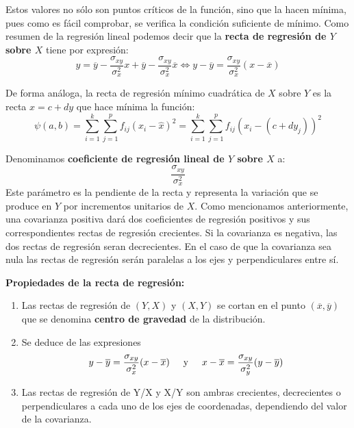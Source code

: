 \documentclass[10pt, a4paper]{article}
\makeatletter
\renewenvironment{proof}[1][\proofname] {\par\pushQED{\qed}\normalfont\topsep6\p@\@plus6\p@\relax\trivlist\item[\hskip\labelsep\itshape\sffamily#1\@addpunct{.}]\ignorespaces}{\popQED\endtrivlist\@endpefalse}
\theoremstyle{theorem-style}
\theoremstyle{definition-style}
\theoremstyle{remark-style}
\theoremstyle{example-style}
\theoremstyle{definition-style}
\theoremstyle{remark-style}
\makeatother
\begin{document}
\pagebreak

Estos valores no sólo son puntos críticos de la función, sino que la hacen
	 mínima, pues como es fácil comprobar, se verifica la condición suficiente de
	 mínimo. Como resumen de la regresión lineal podemos decir que la \textbf{recta de
	 regresión de $Y$ sobre $X$} tiene por expresión:
	$$ y = \overline{y} - \frac{\sigma_{xy}}{\sigma_x^2} x + \overline{y} -
	\frac{\sigma_{xy}}{\sigma_x^2} \overline{x} \iff y - \overline{y} = \frac{\sigma_{xy}}{\sigma_x^2} (x - \overline{x}) $$

	De forma análoga, la recta de regresión mínimo cuadrática de $X$ sobre $Y$ es la
	recta $x = c +dy$ que hace mínima la función: $$\psi (a,b) = \sum_{i=1}^k
	\sum_{j=1}^p f_{ij} {(x_i - \hat{x})}^2 = \sum_{i=1}^k
	\sum_{j=1}^p f_{ij} {(x_i - (c +dy_j))}^2 $$
	
\vspace{2mm}

Denominamos \textbf{coeficiente de regresión lineal de $Y$ sobre $X$} a: $$\frac{\sigma_{xy}}{\sigma_x^2}$$
	Este parámetro es la
	pendiente de la recta y representa la variación que se produce en $Y$ por
	incrementos unitarios de $X$. Como mencionamos anteriormente, una covarianza positiva
	dará dos coeficientes de regresión
	positivos y sus correspondientes rectas de regresión crecientes. Si la
	covarianza es negativa, las dos rectas de regresión seran decrecientes. En el
	caso de que la covarianza sea nula las rectas de regresión serán paralelas a
	los ejes y perpendiculares entre sí.
	
\vspace{5mm}
\textbf{Propiedades de la recta de regresión:}
\begin{enumerate}
	\item Las rectas de regresión de $(Y,X)$ y $(X,Y)$  se cortan en el punto
$(\overline{x},\overline{y} ) $ que se denomina \textbf{centro de gravedad} de la
distribución.

\begin{proof}

Se deduce de las expresiones $$ y - \overline{y} =
\frac{\sigma_{xy}}{\sigma_x^2} (x - \overline{x}) \text{\hspace{0.5cm}y\hspace{0.5cm}} x - \overline{x} =
\frac{\sigma_{xy}}{\sigma_y^2} (y - \overline{y} ) $$

\end{proof}

\item Las rectas de regresión de Y/X y X/Y son ambras crecientes, decrecientes o
perpendiculares a cada uno de los ejes de coordenadas, dependiendo del valor de
la covarianza.
\end{enumerate}
\end{document}
